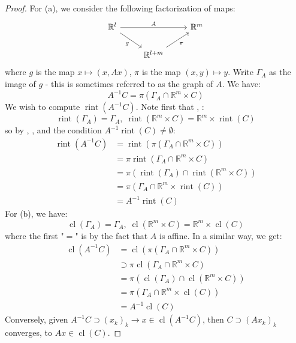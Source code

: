 \begin{proof}
	For (a), we consider the following factorization of maps:
	\[
		\begin{tikzcd}
			\mathbb{R}^l \arrow[rr,"A"]\arrow[dr,swap,"g"] &&\mathbb{R}^{m}\\
			&\mathbb{R}^{l+m}\arrow[ru,swap,"\pi"]&
		\end{tikzcd}
	\]
	where $g$ is the map $x\mapsto (x,Ax)$, $\pi$ is the map $(x, y)\mapsto y$. Write $\Gamma_A$ as the image of $g$ - this is sometimes referred to as the graph of $A$. We have:
	\[
		A^{-1}C=\pi (\Gamma_A\cap \mathbb{R}^m\times C)
	\]
	We wish to compute $\operatorname{rint}(A^{-1}C)$. Note first that , :
	\[
		\operatorname{rint}(\Gamma_A)=\Gamma_A,\; \operatorname{rint}(\mathbb{R}^m\times C)= \mathbb{R}^m \times \operatorname{rint}(C)
	\]
	so by , , and the condition $A^{-1}\operatorname{rint}(C)\neq\emptyset$:
	\begin{align*}
		\operatorname{rint}(A^{-1}C) & =\operatorname{rint}(\pi (\Gamma_A\cap \mathbb{R}^m\times C))                        \\
		                             & =\pi \operatorname{rint}(\Gamma_A\cap \mathbb{R}^m\times C)                          \\
		                             & =\pi (\operatorname{rint}( \Gamma_A )\cap \operatorname{rint}(\mathbb{R}^m\times C)) \\
		                             & =\pi ( \Gamma_A \cap \mathbb{R}^m\times \operatorname{rint}(C))                      \\
		                             & =A^{-1}\operatorname{rint}(C)
	\end{align*}
	For (b), we have:
	\[
		\operatorname{cl}(\Gamma_A)=\Gamma_A,\; \operatorname{cl}(\mathbb{R}^m\times C)= \mathbb{R}^m \times \operatorname{cl}(C)
	\]
	where the first "$=$" is by the fact that $A$ is affine. In a similar way, we get:
	\begin{align*}
		\operatorname{cl}(A^{-1}C) & =\operatorname{cl}(\pi (\Gamma_A\cap \mathbb{R}^m\times C))                      \\
		                           & \supset\pi \operatorname{cl}(\Gamma_A\cap \mathbb{R}^m\times C)                  \\
		                           & =\pi (\operatorname{cl}( \Gamma_A )\cap \operatorname{cl}(\mathbb{R}^m\times C)) \\
		                           & =\pi ( \Gamma_A \cap \mathbb{R}^m\times \operatorname{cl}(C))                    \\
		                           & =A^{-1}\operatorname{cl}(C)
	\end{align*}
	Conversely, given $A^{-1}C\supset (x_k)_k\to x\in \operatorname{cl}(A^{-1}C)$, then $C\supset (Ax_k)_k$ converges, to $Ax\in \operatorname{cl}(C)$.
\end{proof}

